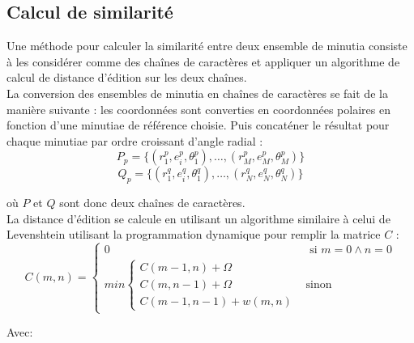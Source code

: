 \documentclass{report}
\begin{document}
\subsection{Calcul de similarité}

Une méthode pour calculer la similarité entre deux ensemble de
minutia consiste à les considérer comme des chaînes de caractères et
appliquer un algorithme de calcul de distance d'édition sur les deux
chaînes.\\

La conversion des ensembles de minutia en chaînes de caractères se
fait de la manière suivante : les coordonnées sont converties en
coordonnées polaires en fonction d'une minutiae de référence
choisie. Puis concaténer le résultat pour chaque minutiae par ordre
croissant d'angle radial :
$$P_p = \{(r_{1}^p, e_{i}^p, \theta_{1}^p), \ldots, (r_{M}^p, e_{M}^p, \theta_{M}^p)\}$$
$$Q_p = \{(r_{1}^q, e_{i}^q, \theta_{1}^q), \ldots, (r_{N}^q, e_{N}^q, \theta_{N}^q)\}$$

où $P$ et $Q$ sont donc deux chaînes de caractères.\\
La distance d'édition se calcule en utilisant un algorithme similaire
à celui de Levenshtein utilisant la programmation dynamique pour
remplir la matrice $C$ :
$$C(m,n) = \left \{
\begin{array}{ll}
  0 & \mbox{ si } m = 0 \land n = 0\\
  min \left \{
      \begin{array}{l}
        C(m - 1, n) + \Omega\\
        C(m, n - 1) + \Omega\\
        C(m - 1, n - 1) + w(m, n)
      \end{array}  \right . & \mbox {sinon } 
\end{array} \right .
$$

Avec:
\end{document}
